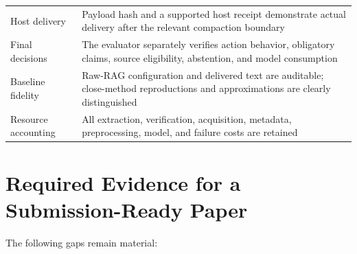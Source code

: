 \begin{longtable}[]{@{}
  >{\raggedright\arraybackslash}p{}
  >{\raggedright\arraybackslash}p{}@{}}
Host delivery & Payload hash and a supported host receipt demonstrate
actual delivery after the relevant compaction boundary \\
Final decisions & The evaluator separately verifies action behavior,
obligatory claims, source eligibility, abstention, and model
consumption \\
Baseline fidelity & Raw-RAG configuration and delivered text are
auditable; close-method reproductions and approximations are clearly
distinguished \\
Resource accounting & All extraction, verification, acquisition,
metadata, preprocessing, model, and failure costs are retained \\
\end{longtable}

\section{Required Evidence for a Submission-Ready
Paper}\label{required-evidence-for-a-submission-ready-paper}

The following gaps remain material:

